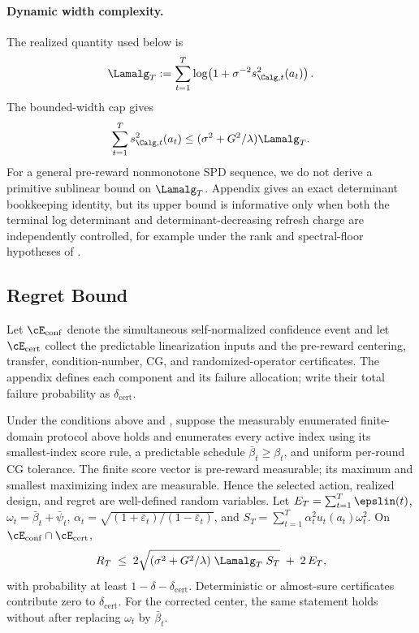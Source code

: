 \paragraph{Dynamic width complexity.}
The realized quantity used below is
\begin{equation}\label{eq:main-lambda}
 \Lamalg_T:=\sum_{t=1}^T\log\!\left(1+\sigma^{-2}s_{\Calg,t}^2(a_t)\right).
\end{equation}
The bounded-width cap gives
\begin{equation}\label{eq:main-dynamic}
 \sum_{t=1}^T s_{\Calg,t}^2(a_t)
 \le(\sigma^2+G^2/\lambda)\Lamalg_T.
\end{equation}
For a general pre-reward nonmonotone SPD sequence, we do not derive a
primitive sublinear bound on $\Lamalg_T$.  Appendix
 gives an exact determinant bookkeeping identity,
but its upper bound is informative only when both the terminal log determinant
and determinant-decreasing refresh charge are independently controlled, for
example under the rank and spectral-floor hypotheses of
.

\subsection{Regret Bound}

Let $\cE_{\mathrm{conf}}$ denote the simultaneous self-normalized confidence
event and let $\cE_{\mathrm{cert}}$ collect the predictable linearization inputs
and the pre-reward centering, transfer, condition-number, CG, and
randomized-operator certificates.
The appendix defines each component and its failure allocation; write their
total failure probability as $\delta_{\mathrm{cert}}$.

\begin{theorem}\label{thm:regret}
Under the conditions above and ,
suppose the measurably enumerated finite-domain protocol above holds and
 enumerates every active index using its smallest-index score
rule, a predictable schedule $\bar\beta_t\ge\beta_t$, and uniform per-round CG
tolerance.  The finite score vector is pre-reward measurable; its maximum and
smallest maximizing index are measurable.  Hence the selected action, realized
design, and regret are well-defined random variables.  Let
$E_T=\sum_{t=1}^T\epslin(t)$, $\omega_t=\bar\beta_t+\bar\psi_t$,
$\alpha_t=\sqrt{(1+\bar\varepsilon_t)/(1-\bar\varepsilon_t)}$, and
$S_T=\sum_{t=1}^T\alpha_t^2u_t(a_t)\omega_t^2$.  On
$\cE_{\mathrm{conf}}\cap\cE_{\mathrm{cert}}$,
\begin{equation}\label{eq:regret-bound}
  R_T
  \;\le\;
  2\sqrt{(\sigma^2 + G^2/\lambda)\;\Lamalg_T\;S_T}
  \;+\; 2\,E_T,
\end{equation}
with probability at least $1-\delta-\delta_{\mathrm{cert}}$.  Deterministic or
almost-sure certificates contribute zero to $\delta_{\mathrm{cert}}$.  For the
corrected center, the same statement holds without  after
replacing $\omega_t$ by $\bar\beta_t$.
\end{theorem}

